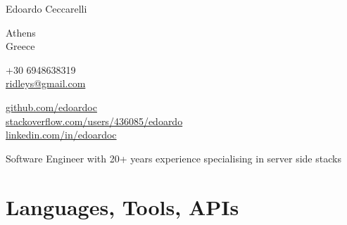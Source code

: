 \documentclass[10pt, a4paper]{article}
\begin{document}
{\LARGE Edoardo Ceccarelli}\\[.2cm]

\begin{multicols}{2}

Athens\\
Greece\\

\vspace{-10pt}

+30 6948638319\\
\href{mailto:ridleys@gmail.com}{ridleys@gmail.com}\\


\columnbreak

\href{http://github.com/edoardoc}{github.com/edoardoc}\\
\href{http://stackoverflow.com/users/436085/edoardo}{stackoverflow.com/users/436085/edoardo}\\
\href{http://linkedin.com/in/edoardoc}{linkedin.com/in/edoardoc}\\
\end{multicols}

\vspace{30pt}

Software Engineer with 20+ years experience specialising in server side
stacks

\section*{Languages, Tools, APIs}
%


\vspace{25pt}
\end{document}
